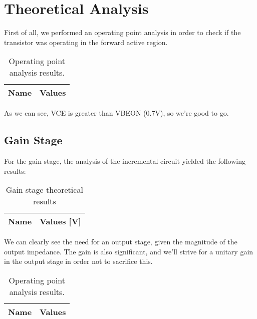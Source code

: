 \section{Theoretical Analysis}
\label{sec:analysis}
First of all, we performed an operating point analysis in order to check if the transistor was operating in the forward active region.
\begin{table}[h!]
  \centering
  \begin{tabular}{|l|r|}
    \hline    
    {\bf Name} & {\bf Values} \\ \hline
     
  \end{tabular}
  \caption{Operating point analysis results.}
  \label{tab:data}
\end{table}

As we can see, VCE is greater than VBEON (0.7V), so we're good to go.
\subsection{Gain Stage}
For the gain stage, the analysis of the incremental circuit yielded the following results:
\begin{table}[h]
  \centering
  \begin{tabular}{|l|r|}
    \hline    
    {\bf Name} & {\bf Values [V]} \\ \hline
     
  \end{tabular}
  \caption{Gain stage theoretical results}
  \label{tab:gain}
\end{table}

We can clearly see the need for an output stage, given the magnitude of the output impedance. The gain is also significant, and we'll strive for a unitary gain in the output stage in order not to sacrifice this.
\begin{table}[h!]
  \centering
  \begin{tabular}{|l|r|}
    \hline    
    {\bf Name} & {\bf Values} \\ \hline
     
  \end{tabular}
  \caption{Operating point analysis results.}
  \label{tab:data2}
\end{table}

